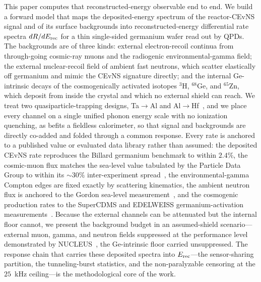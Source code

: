 This paper computes that reconstructed-energy observable end to end. We build a forward model that maps the deposited-energy spectrum of the reactor-CEvNS signal and of its surface backgrounds into reconstructed-energy differential rate spectra $dR/dE_{\rm rec}$ for a thin single-sided germanium wafer read out by QPDs. The backgrounds are of three kinds: external electron-recoil continua from through-going cosmic-ray muons and the radiogenic environmental-gamma field; the external nuclear-recoil field of ambient fast neutrons, which scatter elastically off germanium and mimic the CEvNS signature directly; and the internal Ge-intrinsic decays of the cosmogenically activated isotopes $^{3}$H, $^{68}$Ge, and $^{65}$Zn, which deposit from inside the crystal and which no external shield can reach. We treat two quasiparticle-trapping designs, Ta$\to$Al and Al$\to$Hf~\cite{ramanathan2026}, and we place every channel on a single unified phonon energy scale with no ionization quenching, as befits a fieldless calorimeter, so that signal and backgrounds are directly co-added and folded through a common response. Every rate is anchored to a published value or evaluated data library rather than assumed: the deposited CEvNS rate reproduces the Billard germanium benchmark to within $2.4\%$, the cosmic-muon flux matches the sea-level value tabulated by the Particle Data Group to within its $\sim$$30\%$ inter-experiment spread~\cite{pdg}, the environmental-gamma Compton edges are fixed exactly by scattering kinematics, the ambient neutron flux is anchored to the Gordon sea-level measurement~\cite{gordon2004}, and the cosmogenic production rates to the SuperCDMS and EDELWEISS germanium-activation measurements~\cite{amman2019,edelweiss2017}. Because the external channels can be attenuated but the internal floor cannot, we present the background budget in an assumed-shield scenario---external muon, gamma, and neutron fields suppressed at the performance level demonstrated by NUCLEUS~\cite{nucleus}, the Ge-intrinsic floor carried unsuppressed. The response chain that carries these deposited spectra into $E_{\rm rec}$---the sensor-sharing partition, the tunneling-burst statistics, and the non-paralyzable censoring at the $25$~kHz ceiling---is the methodological core of the work.


